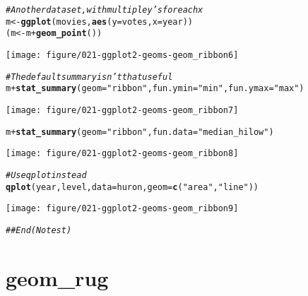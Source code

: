 \documentclass[a4paper,titlepage]{tufte-handout}\usepackage[]{graphicx}\usepackage[]{color}
\makeatletter
\def\maxwidth{ %
  \ifdim\Gin@nat@width>\linewidth
    \linewidth
  \else
    \Gin@nat@width
  \fi
}
\newcommand{\hlstr}[1]{\textcolor[rgb]{0.192,0.494,0.8}{#1}}%
\newcommand{\hlcom}[1]{\textcolor[rgb]{0.678,0.584,0.686}{\textit{#1}}}%
\newcommand{\hlopt}[1]{\textcolor[rgb]{0,0,0}{#1}}%
\newcommand{\hlstd}[1]{\textcolor[rgb]{0.345,0.345,0.345}{#1}}%
\newcommand{\hlkwb}[1]{\textcolor[rgb]{0.69,0.353,0.396}{#1}}%
\newcommand{\hlkwc}[1]{\textcolor[rgb]{0.333,0.667,0.333}{#1}}%
\newcommand{\hlkwd}[1]{\textcolor[rgb]{0.737,0.353,0.396}{\textbf{#1}}}%
\newenvironment{kframe}{%
 \def\at@end@of@kframe{}%
 \ifinner\ifhmode%
  \def\at@end@of@kframe{\end{minipage}}%
  \begin{minipage}{\columnwidth}%
 \fi\fi%
 \def\FrameCommand##1{\hskip\@totalleftmargin \hskip-\fboxsep
 \colorbox{shadecolor}{##1}\hskip-\fboxsep
     \hskip-\linewidth \hskip-\@totalleftmargin \hskip\columnwidth}%
 \MakeFramed {\advance\hsize-\width
   \@totalleftmargin\z@ \linewidth\hsize
   \@setminipage}}%
 {\par\unskip\endMakeFramed%
 \at@end@of@kframe}
\newenvironment{knitrout}{}{} %
\makeatother
\begin{document}
\begin{knitrout}
\begin{kframe}\begin{alltt}
\hlcom{# Another data set, with multiple y's for each x}
\hlstd{m} \hlkwb{<-} \hlkwd{ggplot}\hlstd{(movies,} \hlkwd{aes}\hlstd{(}\hlkwc{y}\hlstd{=votes,} \hlkwc{x}\hlstd{=year))}
\hlstd{(m} \hlkwb{<-} \hlstd{m} \hlopt{+} \hlkwd{geom_point}\hlstd{())}
\end{alltt}
\end{kframe}
\texttt{[image: figure/021-ggplot2-geoms-geom\_ribbon6]} 
\begin{kframe}\begin{alltt}
\hlcom{# The default summary isn't that useful}
\hlstd{m} \hlopt{+} \hlkwd{stat_summary}\hlstd{(}\hlkwc{geom}\hlstd{=}\hlstr{"ribbon"}\hlstd{,} \hlkwc{fun.ymin}\hlstd{=}\hlstr{"min"}\hlstd{,} \hlkwc{fun.ymax}\hlstd{=}\hlstr{"max"}\hlstd{)}
\end{alltt}
\end{kframe}
\texttt{[image: figure/021-ggplot2-geoms-geom\_ribbon7]} 
\begin{kframe}\begin{alltt}
\hlstd{m} \hlopt{+} \hlkwd{stat_summary}\hlstd{(}\hlkwc{geom}\hlstd{=}\hlstr{"ribbon"}\hlstd{,} \hlkwc{fun.data}\hlstd{=}\hlstr{"median_hilow"}\hlstd{)}
\end{alltt}
\end{kframe}
\texttt{[image: figure/021-ggplot2-geoms-geom\_ribbon8]} 
\begin{kframe}\begin{alltt}
\hlcom{# Use qplot instead}
\hlkwd{qplot}\hlstd{(year, level,} \hlkwc{data}\hlstd{=huron,} \hlkwc{geom}\hlstd{=}\hlkwd{c}\hlstd{(}\hlstr{"area"}\hlstd{,} \hlstr{"line"}\hlstd{))}
\end{alltt}


{\ttfamily\noindent\color{warningcolor}{\#\# Warning: Removed 9 rows containing missing values (position\_stack).}}\end{kframe}
\texttt{[image: figure/021-ggplot2-geoms-geom\_ribbon9]} 
\begin{kframe}\begin{alltt}
\hlcom{## End(No test)}
\end{alltt}
\end{kframe}
\end{knitrout}


\section{geom\_rug}
\end{document}
